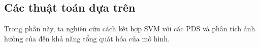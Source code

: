 \subsection{Các thuật toán dựa trên \protect{}}

Trong phần này, ta nghiên cứu cách kết hợp SVM
với các  PDS và phân tích ảnh hưởng của  đến khả năng tổng
quát hóa của mô hình.



